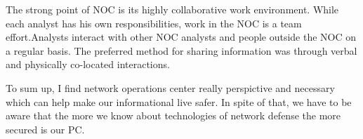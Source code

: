 \documentclass[10pt,a4paper]{article}
\begin{document}
The strong point of NOC is its highly collaborative work environment. While each analyst has his own responsibilities, work in the NOC is a team effort.Analysts interact with other NOC analysts and people outside the NOC on a regular basis. The preferred method for sharing information was through verbal and physically co-located interactions.

To sum up, I find network operations center really perspictive and necessary which can help make our informational live safer. In spite of that, we have to be aware that the more we know about technologies of network defense the more secured is our PC.
\end{document}
